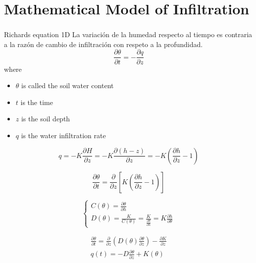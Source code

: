 \section{Mathematical Model of Infiltration}

\begin{frame}
	\frametitle{\secname}

	\begin{block}{Richards equation 1D}
		La variación de la humedad respecto al tiempo es contraria
		a la razón de cambio de infiltración con respeto a la profundidad.
		\begin{equation*}
			\frac{\partial \theta}{\partial t}=-\frac{\partial q}{\partial z}
		\end{equation*}
		where
		\begin{multicols}{2}
			\begin{itemize}
				\item $\theta$ is called the soil water content
				\item $t$ is the time
				\item $z$ is the soil depth
				\item $q$ is the water infiltration rate
			\end{itemize}
		\end{multicols}
	\end{block}

	$$
		q=-K \frac{\partial H}{\partial z}=-K \frac{\partial(h-z)}{\partial z}=-K\left(\frac{\partial h}{\partial z}-1\right)
	$$

	$$
		\frac{\partial \theta}{\partial t}=\frac{\partial}{\partial z}\left[K\left(\frac{\partial h}{\partial z}-1\right)\right]
	$$

	$$
		\left\{\begin{array}{l}
			C(\theta)=\frac{\partial \theta}{\partial h} \\
			D(\theta)=\frac{K}{C(\theta)}=\frac{K}{\frac{\partial \theta}{\partial h}}=K \frac{\partial h}{\partial \theta}
		\end{array}\right.
	$$

	$$
		\begin{gathered}
			\frac{\partial \theta}{\partial t}=\frac{\partial}{\partial z}\left(D(\theta) \frac{\partial \theta}{\partial z}\right)-\frac{\partial K}{\partial z} \\
			q(t)=-D \frac{\partial \theta}{\partial z}+K(\theta)
		\end{gathered}
	$$
\end{frame}